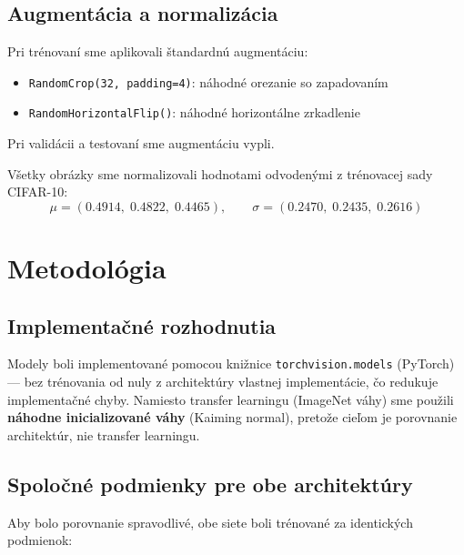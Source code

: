 \documentclass[12pt,a4paper]{article}
\begin{document}
\subsection{Augmentácia a normalizácia}

Pri trénovaní sme aplikovali štandardnú augmentáciu:
\begin{itemize}
  \item \texttt{RandomCrop(32, padding=4)}: náhodné orezanie so zapadovaním
  \item \texttt{RandomHorizontalFlip()}: náhodné horizontálne zrkadlenie
\end{itemize}
Pri validácii a testovaní sme augmentáciu vypli.

Všetky obrázky sme normalizovali hodnotami odvodenými z trénovacej sady CIFAR-10:
\begin{equation}
  \mu = (0.4914,\; 0.4822,\; 0.4465), \qquad \sigma = (0.2470,\; 0.2435,\; 0.2616)
\end{equation}

\section{Metodológia}

\subsection{Implementačné rozhodnutia}

Modely boli implementované pomocou knižnice \texttt{torchvision.models} (PyTorch)
— bez trénovania od nuly z architektúry vlastnej implementácie, čo redukuje
implementačné chyby. Namiesto transfer learningu (ImageNet váhy) sme použili
\textbf{náhodne inicializované váhy} (Kaiming normal), pretože cieľom je porovnanie
architektúr, nie transfer learningu.

\subsection{Spoločné podmienky pre obe architektúry}

Aby bolo porovnanie spravodlivé, obe siete boli trénované za identických podmienok:
\end{document}
